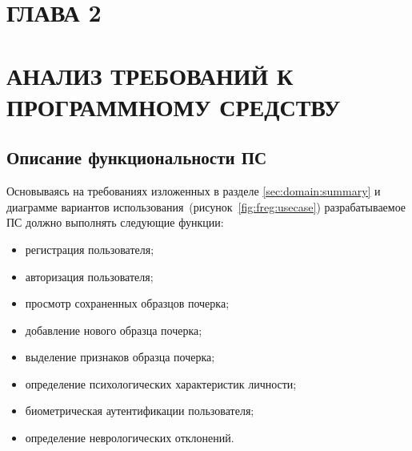 \section*{ГЛАВА 2}
\section*{АНАЛИЗ ТРЕБОВАНИЙ К ПРОГРАММНОМУ СРЕДСТВУ}
\label{sec:freq}
\setcounter{section}{2}
\setcounter{subsection}{0}
\bigskip

\subsection{Описание функциональности ПС}
Основываясь на требованиях изложенных в разделе \ref{sec:domain:summary} и диаграмме вариантов использования~(рисунок~\ref{fig:freg:usecase}) разрабатываемое ПС должно выполнять следующие функции:

\begin{itemize}
	\item регистрация пользователя;
	\item авторизация пользователя;
	\item просмотр сохраненных образцов почерка;
	\item добавление нового образца почерка;
	\item выделение признаков образца почерка;
	\item определение психологических характеристик личности;
	\item биометрическая аутентификации пользователя;
	\item определение неврологических отклонений.
\end{itemize}

